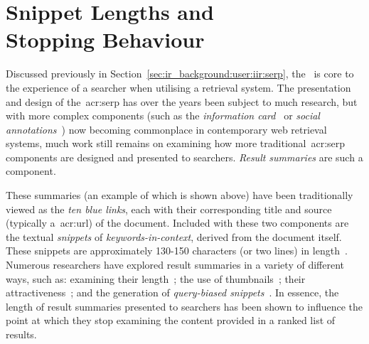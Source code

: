 
\chapter[Snippet Lengths and Stopping Behaviour]{Snippet Lengths and\\Stopping Behaviour}\label{chap:snippets}
Discussed previously in Section~\ref{sec:ir_background:user:iir:serp}, the~ is core to the experience of a searcher when utilising a retrieval system. The presentation and design of the~\gls{acr:serp} has over the years been subject to much research, but with more complex components (such as the \emph{information card}~\citep{navalpakkam2013non_linear_serp} or \emph{social annotations}~\citep{muralidharan2012social_annotations}) now becoming commonplace in contemporary web retrieval systems, much work still remains on examining how more traditional~\gls{acr:serp} components are designed and presented to searchers. \emph{Result summaries} are such a component.

\begin{figure}[h]
    \centering
    \vspace{4mm}
    \label{fig:serpintro}
    \vspace{-5mm}
\end{figure}

These summaries (an example of which is shown above) have been traditionally viewed as the \emph{ten blue links}, each with their corresponding title and source (typically a~\gls{acr:url}) of the document. Included with these two components are the textual \emph{snippets} of \emph{keywords-in-context}, derived from the document itself. These snippets are approximately 130-150 characters (or two lines) in length~\citep{hearst2009_search}. Numerous researchers have explored result summaries in a variety of different ways, such as: examining their length~\citep{paek2004wavelens,cutrell2007eye_tracking,kaisser2008improving}; the use of thumbnails~\citep{woodruff2002summaries,teevan2009visual_snippets}; their attractiveness~\citep{clarke2007caption_features,he2012bridging}; and the generation of \emph{query-biased snippets}~\citep{tombros1998query_biased,rose2007snippet_attributes}. In essence, the length of result summaries presented to searchers has been shown to influence the point at which they stop examining the content provided in a ranked list of results. 


